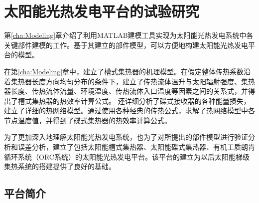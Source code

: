 \chapter{太阳能光热发电平台的试验研究}

第\ref{cha:Modeling}章介绍了利用MATLAB建模工具实现为太阳能光热发电系统中各关键部件建模的工作。基于其建立的部件模型，可以方便地构建太阳能光热发电平台的模型。

在第\ref{cha:Modeling}章中，建立了槽式集热器的机理模型。在假定整体传热系数沿着集热器长度方向均匀分布的条件下，建立了传热流体温升与太阳辐射强度、集热器长度、传热流体流量、环境温度、传热流体入口温度等因素之间的关系式，并得出了槽式集热器的热效率计算公式。
还详细分析了碟式接收器的各种能量损失，建立了详细的热网络模型。通过使用各种经典的传热公式，求解了热网络模型中各节点温度值，并得到了碟式集热器的热效率计算公式。

为了更加深入地理解太阳能光热发电系统，也为了对所提出的部件模型进行验证分析和误差分析，建立了包括太阳能槽式集热器、太阳能碟式集热器、有机工质朗肯循环系统（ORC系统）的太阳能光热发电平台。该平台的建立为以后太阳能梯级集热系统的搭建提供了良好的基础。

\section{平台简介}


